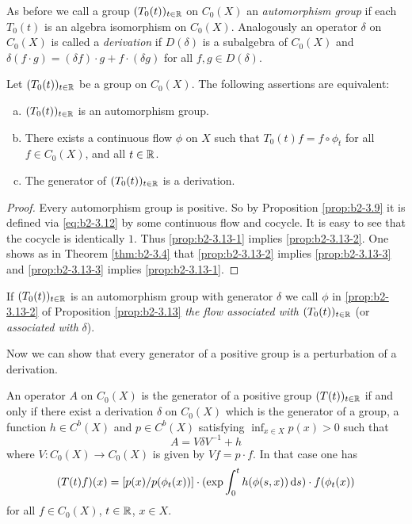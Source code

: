 As before we call a group $(T_{0}(t))_{t \in \mathbb{R}}$ on $C_{0}(X)$ an \emph{automorphism group} if each $T_{0}(t)$ is an algebra isomorphism on $C_{0}(X)$.
Analogously an operator $\delta$ on $C_{0}(X)$ is called a \emph{derivation} if $D(\delta)$ is a subalgebra of $C_{0}(X)$ and $\delta(f \cdot g) = (\delta f) \cdot g + f \cdot (\delta g)$ for all $f,g \in D(\delta)$.

\begin{proposition}\label{prop:b2-3.13}
Let $(T_{0}(t))_{t \in \mathbb{R}}$ be a group on $C_{0}(X)$.
The following assertions are equivalent:
\begin{enumerate}[(a)]
\item \label{prop:b2-3.13-1}
$(T_{0}(t))_{t \in \mathbb{R}}$ is an automorphism group.
\item \label{prop:b2-3.13-2}
There exists a continuous flow $\phi$ on $X$ such that $T_{0}(t)f = f \circ \phi_{t}$  for all  $f \in C_{0}(X)$, and all $t \in \mathbb{R}$.
\item \label{prop:b2-3.13-3} 
The generator of $(T_{0}(t))_{t \in \mathbb{R}}$ is a derivation.
\end{enumerate}
\end{proposition}

\begin{proof}
Every automorphism group is positive.
So by Proposition \ref{prop:b2-3.9}  it is defined via \eqref{eq:b2-3.12} by some continuous flow and cocycle.
It is easy to see that the cocycle is identically $1$.
Thus \ref{prop:b2-3.13-1} implies \ref{prop:b2-3.13-2}.
One shows as in Theorem \ref{thm:b2-3.4}  that \ref{prop:b2-3.13-2} implies \ref{prop:b2-3.13-3} and \ref{prop:b2-3.13-3} implies \ref{prop:b2-3.13-1}.
\end{proof}

If $(T_{0}(t))_{t \in \mathbb{R}}$ is an automorphism group with generator $\delta$ we call $\phi$ in \ref{prop:b2-3.13-2} of Proposition \ref{prop:b2-3.13} \emph{the flow associated with} $(T_{0}(t))_{t \in \mathbb{R}}$ (or \emph{associated with} $\delta$).

Now we can show that every generator of a positive group is a perturbation of a derivation.
\begin{theorem}\label{thm:b2-3.14}
An operator $A$ on $C_{0}(X)$ is the generator of a positive group $(T(t))_{t \in \mathbb{R}}$ if and only if there exist a derivation $\delta$ on $C_{0}(X)$ which is the generator of a group, a function $h \in C^{b}(X)$ and $p \in C^{b}(X)$ satisfying $\inf_{x \in X} p(x) > 0$ such that
\begin{equation}\label{eq:b2-3.18}
A = V\delta V^{-1} + h
\end{equation}
where $V \colon C_{0}(X) \to C_{0}(X)$ is given by $Vf = p \cdot f$. In that case one has
\begin{equation}\label{eq:b2-3.19}
(T(t)f)(x) = [p(x)/p(\phi_{t}(x))] \cdot (\exp \int_{0}^{t} h(\phi(s,x)) \mathop{}\!\mathrm{d}{s}) \cdot f(\phi_{t}(x))
\end{equation}
for all $f \in C_{0}(X)$, $t \in \mathbb{R}$, $x \in X$.
\end{theorem}

